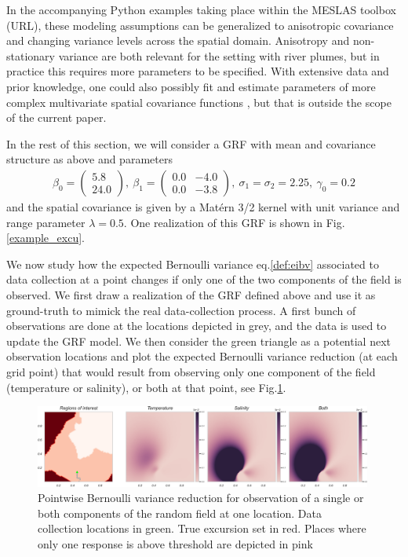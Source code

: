 \documentclass[aoas]{imsart}
\begin{document}
In the accompanying Python examples taking place within the MESLAS toolbox (URL), these modeling assumptions can be
generalized to anisotropic covariance and changing variance levels across the spatial domain. Anisotropy and
non-stationary variance are both relevant for the setting with river
plumes, but in practice this requires more parameters to be
specified. With extensive data and prior knowledge, one could also
possibly fit and estimate parameters of more complex multivariate
spatial covariance functions
\citep{gneiting2010matern,genton2015cross}, but that is outside the
scope of the current paper.

In the rest of this section, we will consider a GRF with mean and covariance structure as above and parameters
\begin{align*}
\beta_0 = \begin{pmatrix}
5.8\\ 24.0
\end{pmatrix}, ~ \beta_1 = \begin{pmatrix}
0.0 & -4.0\\
0.0 & -3.8
\end{pmatrix},~ \sigma_1 = \sigma_2 = 2.25, ~ \gamma_0 = 0.2
\end{align*}
and the spatial covariance is given by a Mat\'{e}rn 3/2 kernel with unit variance and range parameter $\lambda=0.5$.
One realization of this GRF is shown in Fig. \ref{example_excu}.

We now study how the expected Bernoulli variance eq.\eqref{def:eibv} associated to data collection at a point changes if only one of the two components of the field is observed. We first draw a realization of the GRF defined above and use it as ground-truth to mimick the real data-collection process. A first bunch of observations are done at the locations depicted in grey, and the data is used to update the GRF model. We then consider the green triangle as a potential next observation locations and plot the expected Bernoulli variance reduction (at each grid point) that would result from observing only one component of the field (temperature or salinity), or both at that point, see Fig.\ref{fig:ebv_comp}.

\begin{figure}[h!] \centering
  \includegraphics[width=0.99\textwidth]{Figures/ebv_comp_2.png}
  \caption{Pointwise Bernoulli variance reduction for observation of a single or both components of the random field at one location. Data collection locations in green. True excursion set in red. Places where only one response is above threshold are depicted in pink}
\label{fig:ebv_comp}
\end{figure}
\end{document}
